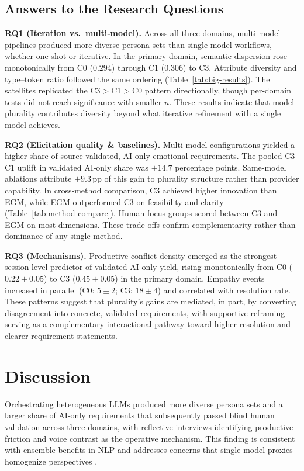 \documentclass[acmsmall]{acmart}
\begin{document}
\subsection{Answers to the Research Questions}
\label{sec:results-rq-answers}
\noindent\textbf{RQ1 (Iteration vs.\ multi‑model).} Across all three domains, multi‑model pipelines produced more diverse persona sets than single‑model workflows, whether one‑shot or iterative. In the primary domain, semantic dispersion rose monotonically from C0 ($0.294$) through C1 ($0.306$) to C3. Attribute diversity and type–token ratio followed the same ordering (Table~\ref{tab:big-results}). The satellites replicated the C3${>}$C1${>}$C0 pattern directionally, though per‑domain tests did not reach significance with smaller $n$. These results indicate that model plurality contributes diversity beyond what iterative refinement with a single model achieves.

\smallskip
\noindent\textbf{RQ2 (Elicitation quality \& baselines).} Multi‑model configurations yielded a higher share of source‑validated, AI‑only emotional requirements. The pooled C3–C1 uplift in validated AI‑only share was $+14.7$ percentage points. Same‑model ablations attribute $+9.3$\,pp of this gain to plurality structure rather than provider capability. In cross‑method comparison, C3 achieved higher innovation than EGM, while EGM outperformed C3 on feasibility and clarity (Table~\ref{tab:method-compare}). Human focus groups scored between C3 and EGM on most dimensions. These trade‑offs confirm complementarity rather than dominance of any single method.

\smallskip
\noindent\textbf{RQ3 (Mechanisms).} Productive‑conflict density emerged as the strongest session‑level predictor of validated AI‑only yield, rising monotonically from C0 ($0.22{\pm}0.05$) to C3 ($0.45{\pm}0.05$) in the primary domain. Empathy events increased in parallel (C0: $5{\pm}2$; C3: $18{\pm}4$) and correlated with resolution rate. These patterns suggest that plurality's gains are mediated, in part, by converting disagreement into concrete, validated requirements, with supportive reframing serving as a complementary interactional pathway toward higher resolution and clearer requirement statements.

\section{Discussion}

Orchestrating heterogeneous LLMs produced more diverse persona sets and a larger share of AI‑only requirements that subsequently passed blind human validation across three domains, with reflective interviews identifying productive friction and voice contrast as the operative mechanism. This finding is consistent with ensemble benefits in NLP \cite{yang2025large,deiner2024large} and addresses concerns that single‑model proxies homogenize perspectives \cite{kung2023performance,lin2025leveraging}.
\end{document}
